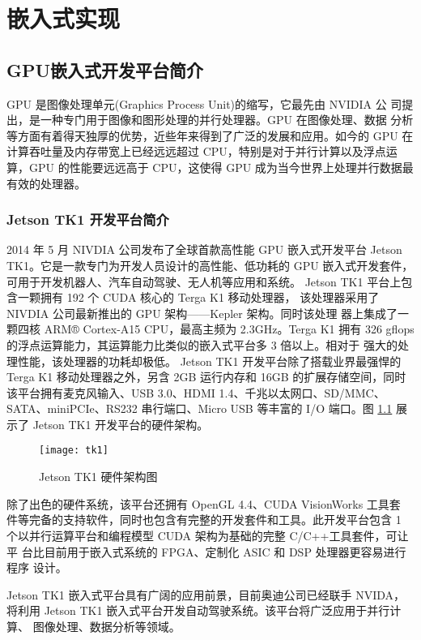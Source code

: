 \chapter{嵌入式实现}

\section{GPU嵌入式开发平台简介}
GPU 是图像处理单元(Graphics Process Unit)的缩写，它最先由 NVIDIA 公 司提出，是一种专门用于图像和图形处理的并行处理器。GPU 在图像处理、数据 分析等方面有着得天独厚的优势，近些年来得到了广泛的发展和应用。如今的 GPU 在计算吞吐量及内存带宽上已经远远超过 CPU，特别是对于并行计算以及浮点运 算，GPU 的性能要远远高于 CPU，这使得 GPU 成为当今世界上处理并行数据最 有效的处理器。

\subsection{Jetson TK1 开发平台简介}
2014 年 5 月 NIVDIA 公司发布了全球首款高性能 GPU 嵌入式开发平台 Jetson TK1。它是一款专门为开发人员设计的高性能、低功耗的 GPU 嵌入式开发套件， 可用于开发机器人、汽车自动驾驶、无人机等应用和系统。
Jetson TK1 平台上包含一颗拥有 192 个 CUDA 核心的 Terga K1 移动处理器， 该处理器采用了 NIVDIA 公司最新推出的 GPU 架构——Kepler 架构。同时该处理 器上集成了一颗四核 ARM® Cortex-A15 CPU，最高主频为 2.3GHz。Terga K1 拥有 326 gflops 的浮点运算能力，其运算能力比类似的嵌入式平台多 3 倍以上。相对于 强大的处理性能，该处理器的功耗却极低。
Jetson TK1 开发平台除了搭载业界最强悍的 Terga K1 移动处理器之外，另含 2GB 运行内存和 16GB 的扩展存储空间，同时该平台拥有麦克风输入、USB 3.0、HDMI 1.4、千兆以太网口、SD/MMC、SATA、miniPCIe、RS232 串行端口、Micro
USB 等丰富的 I/O 端口。图 \ref{fig:tk1} 展示了 Jetson TK1 开发平台的硬件架构。
\begin{figure}
	\centering
	\texttt{[image: tk1]}
	\caption{Jetson TK1 硬件架构图}
	\label{fig:tk1}
\end{figure}

除了出色的硬件系统，该平台还拥有 OpenGL 4.4、CUDA VisionWorks 工具套 件等完备的支持软件，同时也包含有完整的开发套件和工具。此开发平台包含 1 个以并行运算平台和编程模型 CUDA 架构为基础的完整 C/C++工具套件，可让平 台比目前用于嵌入式系统的 FPGA、定制化 ASIC 和 DSP 处理器更容易进行程序 设计。

Jetson TK1 嵌入式平台具有广阔的应用前景，目前奥迪公司已经联手 NVIDA， 将利用 Jetson TK1 嵌入式平台开发自动驾驶系统。该平台将广泛应用于并行计算、 图像处理、数据分析等领域。

